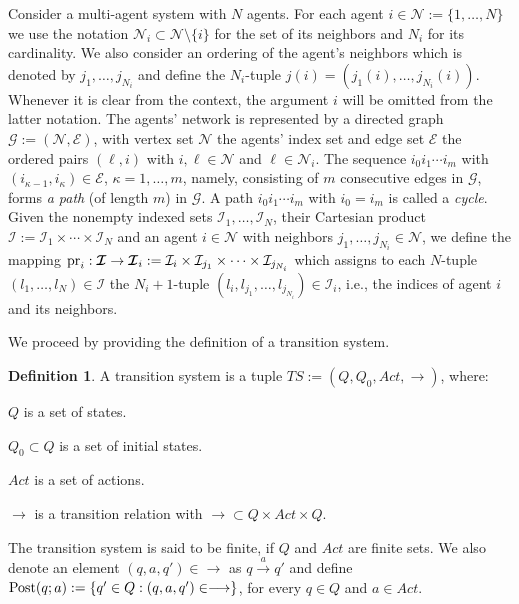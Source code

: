 \documentclass[reqno]{amsart}
\theoremstyle{plain}
\theoremstyle{definition}
\newtheorem{dfn}[thm]{Definition}
\numberwithin{equation}{section}
\begin{document}
Consider a multi-agent system with $N$ agents. For each agent $i\in{\ensuremath{\mathcal{N}}}:=\{1,\ldots,N\}$ we use the notation $\mathcal{N}_i\subset{\ensuremath{\mathcal{N}}}\setminus\{i\}$ for the set of its neighbors and $N_i$ for its cardinality. We also consider an ordering of the agent's neighbors which is denoted by $j_1,\ldots,j_{N_i}$ and define the $N_i$-tuple $j(i)=(j_1(i),\ldots,j_{N_i}(i))$. Whenever it is clear from the context, the argument $i$ will be omitted from the latter notation. The agents' network is represented by a directed graph ${\ensuremath{\mathcal{G}}}:=({\ensuremath{\mathcal{N}}},{\ensuremath{\mathcal{E}}})$, with vertex set ${\ensuremath{\mathcal{N}}}$ the agents' index set and edge set ${\ensuremath{\mathcal{E}}}$ the ordered pairs $(\ell,i)$ with $i,\ell\in{\ensuremath{\mathcal{N}}}$ and $\ell\in{\ensuremath{\mathcal{N}}}_i$. The sequence $i_0i_1\cdots i_m$ with $(i_{\kappa-1},i_{\kappa})\in{\ensuremath{\mathcal{E}}}$, $\kappa=1,\ldots,m$, namely, consisting of $m$ consecutive edges in ${\ensuremath{\mathcal{G}}}$, forms \textit{a path} (of length $m$) in ${\ensuremath{\mathcal{G}}}$. A path $i_0i_1\cdots i_m$ with $i_0=i_m$ is called a \textit{cycle}. Given the nonempty indexed sets ${\ensuremath{\mathcal{I}}}_1,\ldots,{\ensuremath{\mathcal{I}}}_N$, their Cartesian product ${\ensuremath{\boldsymbol{\mathcal{I}}}}:={\ensuremath{\mathcal{I}}}_1\times\cdots\times{\ensuremath{\mathcal{I}}}_N$ and an agent $i\in{\ensuremath{\mathcal{N}}}$ with neighbors $j_1,\ldots,j_{N_i}\in{\ensuremath{\mathcal{N}}}$, we define the mapping ${\rm pr}_i:{\ensuremath{\boldsymbol{\mathcal{I}}}}\to{\ensuremath{\boldsymbol{\mathcal{I}}}}_i:={\ensuremath{\mathcal{I}}}_i\times{\ensuremath{\mathcal{I}}}_{j_1}\times\cdots\times{\ensuremath{\mathcal{I}}}_{j_{N_i}}$ which assigns to each $N$-tuple $(l_1,\ldots,l_N)\in{\ensuremath{\boldsymbol{\mathcal{I}}}}$ the $N_i+1$-tuple $(l_i,l_{j_1},\ldots,l_{j_{N_i}})\in{\ensuremath{\boldsymbol{\mathcal{I}}}}_i$, i.e., the indices of agent $i$ and its neighbors.

We proceed by providing the definition of a transition system.

\begin{dfn}
A transition system is a tuple $TS:=(Q,Q_0,Act,\longrightarrow)$, where:

\textbullet\; $Q$ is a set of states.

\textbullet\; $Q_0\subset Q$ is a set of initial states.

\textbullet\; $Act$ is a set of actions.

\textbullet\; $\longrightarrow$ is a transition relation with $\longrightarrow\subset Q\times Act\times Q$.

\noindent The transition system is said to be finite, if $Q$ and $Act$ are finite sets. We also denote an element $(q,a,q')\in\longrightarrow$ as  $q\overset{a}{\longrightarrow} q'$ and define ${\rm Post}(q;a):=\{q'\in Q:(q,a,q')\in\longrightarrow\}$, for every $q\in Q$ and $a\in Act$.
\end{dfn}
\end{document}

